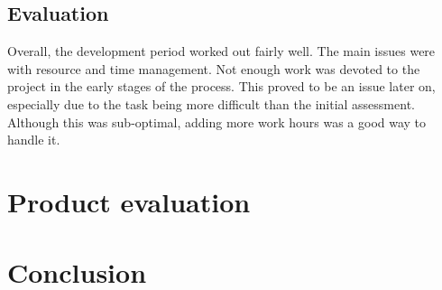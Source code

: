 


\subsection{Evaluation}
\label{subsec:project_evaluation-development-evaluation}

Overall, the development period worked out fairly well. The main issues were with resource and time management. Not enough work was devoted to the project in the early stages of the process. This proved to be an issue later on, especially due to the task being more difficult than the initial assessment. Although this was sub-optimal, adding more work hours was a good way to handle it.

\section{Product evaluation}
\label{sec:project_evaluation-product_evaluation}



\section{Conclusion}
\label{sec:project_evaluation-conclusion}

